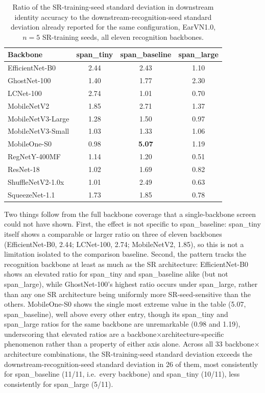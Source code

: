 \documentclass[11pt]{article}
\begin{document}
\begin{table}[H]
\centering
\caption{Ratio of the SR-training-seed standard deviation in downstream identity accuracy to the downstream-recognition-seed standard deviation already reported for the same configuration, EarVN1.0, $n{=}5$ SR-training seeds, all eleven recognition backbones.}
\label{tab:sr-seed-variance}
\begin{tabular}{lccc}
\toprule
Backbone & span\_tiny & span\_baseline & span\_large \\
\midrule
EfficientNet-B0     & 2.44 & 2.43 & 1.10 \\
GhostNet-100        & 1.40 & 1.77 & 2.30 \\
LCNet-100           & 2.74 & 1.01 & 0.70 \\
MobileNetV2         & 1.85 & 2.71 & 1.37 \\
MobileNetV3-Large   & 1.28 & 1.50 & 0.97 \\
MobileNetV3-Small   & 1.03 & 1.33 & 1.06 \\
MobileOne-S0        & 0.98 & \textbf{5.07} & 1.19 \\
RegNetY-400MF       & 1.14 & 1.20 & 0.51 \\
ResNet-18           & 1.02 & 1.69 & 0.82 \\
ShuffleNetV2-1.0x   & 1.01 & 2.49 & 0.63 \\
SqueezeNet-1.1      & 1.73 & 1.85 & 0.78 \\
\bottomrule
\end{tabular}
\end{table}

Two things follow from the full backbone coverage that a single-backbone screen could not have shown. First, the effect is not specific to span\_baseline: span\_tiny itself shows a comparable or larger ratio on three of eleven backbones (EfficientNet-B0, 2.44; LCNet-100, 2.74; MobileNetV2, 1.85), so this is not a limitation isolated to the comparison baseline. Second, the pattern tracks the recognition backbone at least as much as the SR architecture: EfficientNet-B0 shows an elevated ratio for span\_tiny and span\_baseline alike (but not span\_large), while GhostNet-100's highest ratio occurs under span\_large, rather than any one SR architecture being uniformly more SR-seed-sensitive than the others. MobileOne-S0 shows the single most extreme value in the table (5.07, span\_baseline), well above every other entry, though its span\_tiny and span\_large ratios for the same backbone are unremarkable (0.98 and 1.19), underscoring that elevated ratios are a backbone$\times$architecture-specific phenomenon rather than a property of either axis alone. Across all 33 backbone$\times$architecture combinations, the SR-training-seed standard deviation exceeds the downstream-recognition-seed standard deviation in 26 of them, most consistently for span\_baseline (11/11, i.e.\ every backbone) and span\_tiny (10/11), less consistently for span\_large (5/11).
\end{document}
